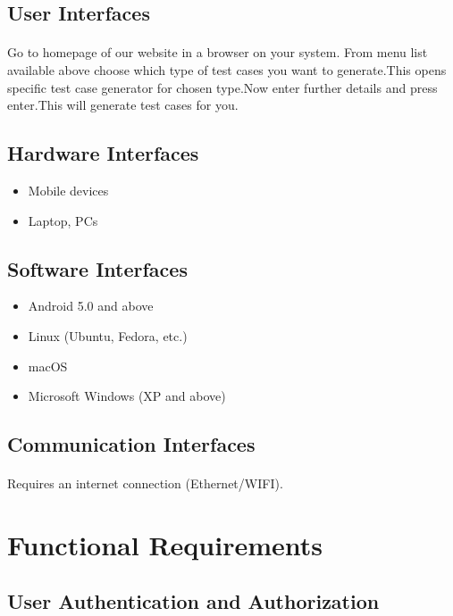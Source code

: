 \documentclass{article}
\begin{document}
\subsection{User Interfaces}
\paragraph{}
Go to homepage of our website in a browser on your system. From menu list available
above choose which type of test cases you want to generate.This opens specific test
case generator for chosen type.Now enter further details and press enter.This will
generate test cases for you.

\subsection{Hardware Interfaces}
\begin{itemize}
    \item Mobile devices
    \item Laptop, PCs
\end{itemize}

\subsection{Software Interfaces}
\begin{itemize}
    \item Android 5.0 and above
    \item Linux (Ubuntu, Fedora, etc.)
    \item macOS
    \item Microsoft Windows (XP and above)
\end{itemize}

\subsection{Communication Interfaces}
\paragraph{}
Requires an internet connection (Ethernet/WIFI).


\section{Functional Requirements}
\subsection{User Authentication and Authorization}
\end{document}
